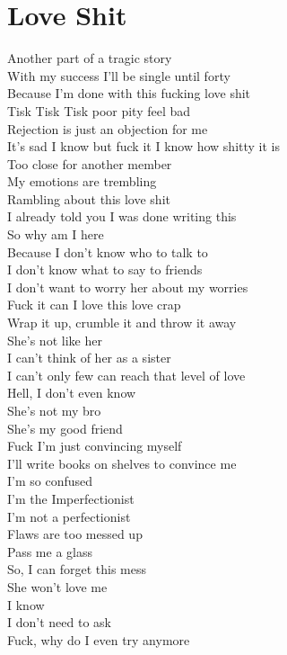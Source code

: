 \documentclass[12pt, b5paper]{article}
\begin{document}
	
\newpage

\section{Love Shit}
Another part of a tragic story 
\\With my success I’ll be single until forty 
\\Because I’m done with this fucking love shit 
\\Tisk Tisk Tisk poor pity feel bad 
\\Rejection is just an objection for me 
\\It’s sad I know but fuck it I know how shitty it is
\\Too close for another member
\\My emotions are trembling 
\\Rambling about this love shit 
\\I already told you I was done writing this 
\\So why am I here 
\\Because I don’t know who to talk to 
\\I don’t know what to say to friends
\\I don’t want to worry her about my worries 
\\Fuck it can I love this love crap 
\\Wrap it up, crumble it and throw it away
\\She’s not like her 
\\I can’t think of her as a sister
\\I can’t only few can reach that level of love
\\Hell, I don’t even know 
\\She’s not my bro
\\She’s my good friend 
\\Fuck I’m just convincing myself 
\\I’ll write books on shelves to convince me 
\\I’m so confused
\\I’m the Imperfectionist 
\\I’m not a perfectionist 
\\Flaws are too messed up
\\Pass me a glass
\\So, I can forget this mess
\\She won’t love me
\\I know
\\I don’t need to ask
\\Fuck, why do I even try anymore
\end{document}
